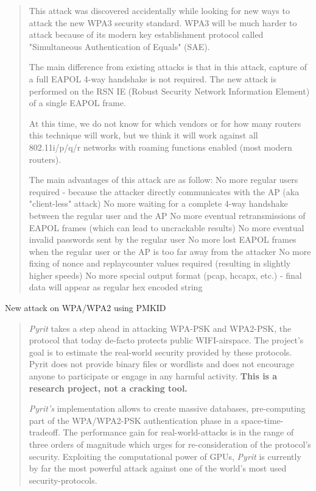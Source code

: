 \documentclass[Screen16to9,17pt]{foils}
\begin{document}
\begin{quote}\small
This attack was discovered accidentally while looking for new ways to attack the new WPA3 security standard. WPA3 will be much harder to attack because of its modern key establishment protocol called "Simultaneous Authentication of Equals" (SAE).

The main difference from existing attacks is that in this attack, capture of a full EAPOL 4-way handshake is not required. The new attack is performed on the RSN IE (Robust Security Network Information Element) of a single EAPOL frame.

At this time, we do not know for which vendors or for how many routers this technique will work, but we think it will work against all 802.11i/p/q/r networks with roaming functions enabled (most modern routers).

The main advantages of this attack are as follow:
No more regular users required - because the attacker directly communicates with the AP (aka "client-less" attack)
No more waiting for a complete 4-way handshake between the regular user and the AP
No more eventual retransmissions of EAPOL frames (which can lead to uncrackable results)
No more eventual invalid passwords sent by the regular user
No more lost EAPOL frames when the regular user or the AP is too far away from the attacker
No more fixing of nonce and replaycounter values required (resulting in slightly higher speeds)
No more special output format (pcap, hccapx, etc.) - final data will appear as regular hex encoded string
\end{quote}

\begin{list2}
\item {} New attack on WPA/WPA2 using PMKID
\item {}
\end{list2}




\begin{quote}
\emph{Pyrit} takes a step ahead in attacking WPA-PSK and WPA2-PSK, the protocol that today de-facto protects public WIFI-airspace. The project's goal is to estimate the real-world security provided by these protocols. Pyrit does not provide binary files or wordlists and does not encourage anyone to participate or engage in any harmful activity. {\bf This is a research project, not a cracking tool.}

\emph{Pyrit's} implementation allows to create massive databases, pre-computing part of the WPA/WPA2-PSK authentication phase in a space-time-tradeoff. The performance gain for real-world-attacks is in the range of three orders of magnitude which urges for re-consideration of the protocol's security. Exploiting the computational power of GPUs, \emph{Pyrit} is currently by far the most powerful attack against one of the world's most used security-protocols.
\end{quote}
\end{document}
